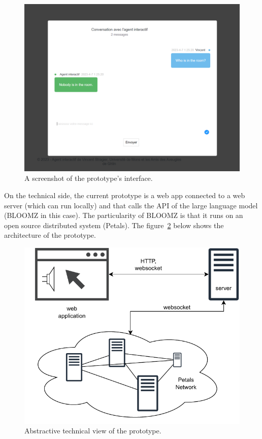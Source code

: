 \documentclass[sigconf]{acmart}
\begin{document}
\begin{figure}[ht]
  \centering
  \includegraphics[width=0.7\linewidth]{figures/chatbot_interface.png}
  \caption{A screenshot of the prototype's interface.\label{fig:chatbot_interface}}
\end{figure}

On the technical side, the current prototype is a web app connected to a web server (which can run locally) and that calls the API of the large language model (BLOOMZ in this case). The particularity of BLOOMZ is that it runs on an open source distributed system (Petals). The figure~\ref{fig:abstractive_view_interface} below shows the architecture of the prototype.

\begin{figure}[ht]
  \centering
  \includegraphics[width=0.5\linewidth]{figures/schematics-interactive_agent.drawio.pdf}
  \caption{Abstractive technical view of the prototype.\label{fig:abstractive_view_interface}}
\end{figure}
\end{document}
